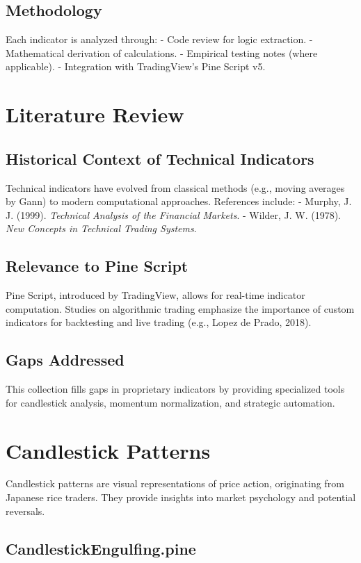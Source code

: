 \documentclass[12pt]{article}
\begin{document}
\subsection{Methodology}
Each indicator is analyzed through:
- Code review for logic extraction.
- Mathematical derivation of calculations.
- Empirical testing notes (where applicable).
- Integration with TradingView's Pine Script v5.

\section{Literature Review}
\label{sec:literature}

\subsection{Historical Context of Technical Indicators}
Technical indicators have evolved from classical methods (e.g., moving averages by Gann) to modern computational approaches. References include:
- Murphy, J. J. (1999). \textit{Technical Analysis of the Financial Markets}.
- Wilder, J. W. (1978). \textit{New Concepts in Technical Trading Systems}.

\subsection{Relevance to Pine Script}
Pine Script, introduced by TradingView, allows for real-time indicator computation. Studies on algorithmic trading emphasize the importance of custom indicators for backtesting and live trading (e.g., Lopez de Prado, 2018).

\subsection{Gaps Addressed}
This collection fills gaps in proprietary indicators by providing specialized tools for candlestick analysis, momentum normalization, and strategic automation.

\section{Candlestick Patterns}
\label{sec:candlestick}

Candlestick patterns are visual representations of price action, originating from Japanese rice traders. They provide insights into market psychology and potential reversals.

\subsection{CandlestickEngulfing.pine}
\label{subsec:engulfing}
\end{document}
